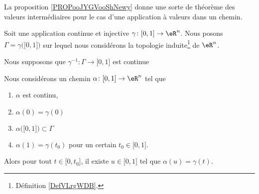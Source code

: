 La proposition \ref{PROPooJYGVooShNewy} donne une sorte de théorème des valeurs intermédiaires pour le cas d'une application à valeurs dans un chemin.
\begin{proposition}     \label{PROPooJYGVooShNewy}
	Soit une application continue et injective \( \gamma\colon \mathopen[ 0 , 1 \mathclose]\to \eR^n\). Nous posons \( \Gamma=\gamma\big( \mathopen[ 0 , 1 \mathclose] \big)\) sur lequel nous considérons la topologie induite\footnote{Définition \ref{DefVLrgWDB}.} de \( \eR^n\).

	Nous supposons que \( \gamma^{-1}\colon \Gamma\to \mathopen[ 0 , 1 \mathclose]\) est continue

	Nous considérons un chemin \( \alpha\colon \mathopen[ 0 , 1 \mathclose]\to \eR^n\) tel que
	\begin{enumerate}
		\item
		      \( \alpha\) est continu,
		\item
		      \( \alpha(0)=\gamma(0)\)
		\item
		      \( \alpha\big( \mathopen[ 0 , 1 \mathclose] \big)\subset \Gamma\)
		\item
		      \( \alpha(1)=\gamma(t_0)\) pour un certain \( t_0\in \mathopen[ 0 , 1 \mathclose]\).
	\end{enumerate}
	Alors pour tout \( t\in\mathopen[ 0 , t_0 \mathclose]\), il existe \( u\in\mathopen[ 0 , 1 \mathclose]\) tel que \( \alpha(u)=\gamma(t)\).
\end{proposition}

